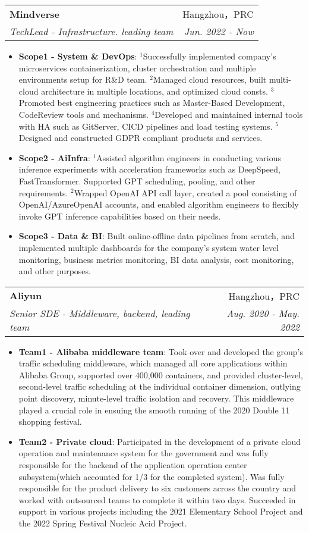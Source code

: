 \documentclass[letterpaper,11pt]{article}
\makeatletter
\newcommand{\resumeItem}[2]{
	\item\small{
		\textbf{#1}{: #2 \vspace{-2pt}}
	}
}
\newcommand{\resumeSubheading}[4]{
	\vspace{-1pt}\item
	\begin{tabular*}{0.97\textwidth}[t]{l@{\extracolsep{\fill}}r}
		\textbf{#1} & #2 \\
		\textit{\small#3} & \textit{\small #4} \\
	\end{tabular*}\vspace{-5pt}
}
\newcommand{\resumeItemListStart}{\begin{itemize}}
\newcommand{\resumeItemListEnd}{\end{itemize}\vspace{-5pt}}
\makeatother
\begin{document}
\begin{spacing}{0.80}
	\resumeSubheading
	{Mindverse}{Hangzhou，PRC}
	{TechLead - Infrastructure. leading team}{Jun. 2022 - Now}
	\resumeItemListStart
	\resumeItem{Scope1 - System \& DevOps}
	{$^1$Successfully implemented company's microservices containerization, cluster orchestration and multiple environments setup for R\&D team. $^2$Managed cloud resources, built multi-cloud architecture in multiple locations, and optimized cloud consts. $^3$Promoted best engineering practices such as Master-Based Development, CodeReview tools and mechanisms. $^4$Developed and maintained internal tools with HA such as GitServer, CICD pipelines and load testing systems. $^5$Designed and constructed GDPR compliant products and services.}
	\resumeItem{Scope2 - AiInfra}
	{$^1$Assisted algorithm engineers in conducting various inference experiments with acceleration frameworks such as DeepSpeed, FastTransformer. Supported GPT scheduling, pooling, and other requirements. $^2$Wrapped OpenAI API call layer, created a pool consisting of OpenAI/AzureOpenAI accounts, and enabled algorithm engineers to flexibly invoke GPT inference capabilities based on their needs.}
	\resumeItem{Scope3 - Data \& BI}
	{Built online-offline data pipelines from scratch, and implemented multiple dashboards for the company's system water level monitoring, business metrics monitoring, BI data analysis, cost monitoring, and other purposes.}
	\resumeItemListEnd
	\resumeSubheading
	{Aliyun}{Hangzhou，PRC}
	{Senior SDE - Middleware, backend, leading team}{Aug. 2020 - May. 2022}
	\resumeItemListStart
	\resumeItem{Team1 - Alibaba middleware team}
	{Took over and developed the group's traffic scheduling middleware, which managed all core applications within Alibaba Group, supported over 400,000 containers, and provided cluster-level, second-level traffic scheduling at the individual container dimension, outlying point discovery, minute-level traffic isolation and recovery. This middleware played a crucial role in ensuing the smooth running of the 2020 Double 11 shopping festival.}
	\resumeItem{Team2 - Private cloud}
	{Participated in the development of a private cloud operation and maintenance system for the government and was fully responsible for the backend of the application operation center subsystem(which accounted for 1/3 for the completed system). Was fully responsible for the product delivery to six customers across the country and worked with outsourced teams to complete it within two days. Succeeded in support in various projects including the 2021 Elementary School Project and the 2022 Spring Festival Nucleic Acid Project.}
	\resumeItemListEnd
	

\end{spacing}
\end{document}
